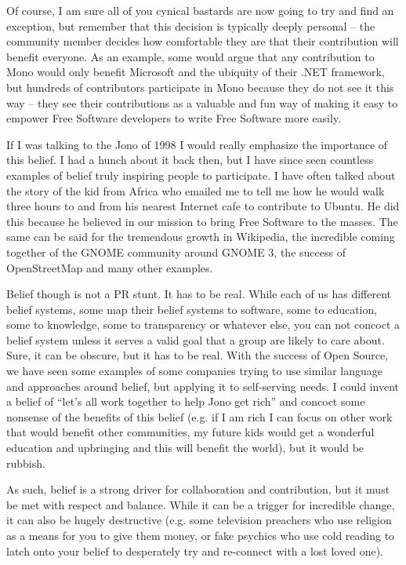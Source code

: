 Of course, I am sure all of you cynical bastards are now going to try and find
an exception, but remember that this decision is typically deeply personal --
the community member decides how comfortable they are that their contribution
will benefit everyone. As an example, some would argue that any contribution to
Mono would only benefit Microsoft and the ubiquity of their .NET framework, but
hundreds of contributors participate in Mono because they do not see it this way
-- they see their contributions as a valuable and fun way of making it easy to
empower Free Software developers to write Free Software more easily.

If I was talking to the Jono of 1998 I would really emphasize the importance of
this belief. I had a hunch about it back then, but I have since seen countless
examples of belief truly inspiring people to participate. I have often talked
about the story of the kid from Africa who emailed me to tell me how he would
walk three hours to and from his nearest Internet cafe to contribute to Ubuntu.
He did this because he believed in our mission to bring Free Software to the
masses. The same can be said for the tremendous growth in Wikipedia, the
incredible coming together of the GNOME community around GNOME 3, the success of
OpenStreetMap and many other examples.

Belief though is not a PR stunt. It has to be real. While each of us has
different belief systems, some map their belief systems to software, some to
education, some to knowledge, some to transparency or whatever else, you can not
concoct a belief system unless it serves a valid goal that a group are likely to
care about. Sure, it can be obscure, but it has to be real. With the success of
Open Source, we have seen some examples of some companies trying to use similar
language and approaches around belief, but applying it to self-serving needs. I
could invent a belief of ``let’s all work together to help Jono get rich'' and
concoct some nonsense of the benefits of this belief (e.g. if I am rich I can
focus on other work that would benefit other communities, my future kids would
get a wonderful education and upbringing and this will benefit the world), but
it would be rubbish.

As such, belief is a strong driver for collaboration and contribution, but it
must be met with respect and balance. While it can be a trigger for incredible
change, it can also be hugely destructive (e.g. some television preachers who
use religion as a means for you to give them money, or fake psychics who use
cold reading to latch onto your belief to desperately try and re-connect with a
lost loved one).

